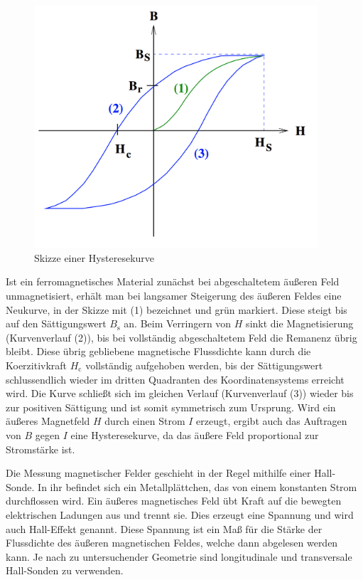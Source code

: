 \begin{figure}
  \centering
  \includegraphics[width=300pt]{data/hysterese.png}
  \caption{Skizze einer Hysteresekurve \cite{Versuchsanleitung}}
  \label{fig:hysteresetheorie}
\end{figure}

Ist ein ferromagnetisches Material zunächst bei abgeschaltetem äußeren Feld unmagnetisiert,
erhält man bei langsamer Steigerung des äußeren Feldes eine Neukurve, in der Skizze
mit (1) bezeichnet und grün markiert.
Diese steigt bis auf den Sättigungswert $B_\text{s}$ an. Beim Verringern von $H$
sinkt die Magnetisierung (Kurvenverlauf (2)), bis bei vollständig abgeschaltetem Feld die Remanenz übrig
bleibt. Diese übrig gebliebene magnetische Flussdichte kann durch die Koerzitivkraft
$H_\text{c}$ vollständig aufgehoben werden, bis der Sättigungswert schlussendlich wieder
im dritten Quadranten des Koordinatensystems erreicht wird. Die Kurve schließt sich
im gleichen Verlauf (Kurvenverlauf (3)) wieder bis zur positiven Sättigung und ist somit symmetrisch zum Ursprung.
Wird ein äußeres Magnetfeld $H$ durch einen Strom $I$ erzeugt, ergibt auch das Auftragen
von $B$ gegen $I$ eine Hysteresekurve, da das äußere Feld proportional zur Stromstärke ist.

Die Messung magnetischer Felder geschieht in der Regel mithilfe einer Hall-Sonde.
In ihr befindet sich ein Metallplättchen, das von einem konstanten Strom durchflossen wird.
Ein äußeres magnetisches Feld übt Kraft auf die bewegten elektrischen Ladungen aus
und trennt sie. Dies erzeugt eine Spannung und wird auch Hall-Effekt genannt.
Diese Spannung ist ein Maß für die Stärke der Flussdichte des äußeren magnetischen Feldes, welche
dann abgelesen werden kann. Je nach zu untersuchender Geometrie sind longitudinale und transversale Hall-Sonden
zu verwenden.
